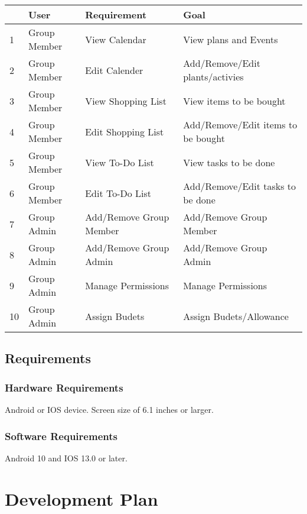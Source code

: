 \documentclass[12pt]{article}
\begin{document}
\begin{table}[h]
    \small
    \begin{tabularx}{\textwidth}{|p{12pt}|p{85pt}|X|X|}
        \hline  & User & Requirement & Goal \\
        \hline 1 & Group Member & View Calendar & View plans and Events \\
        \hline 2 & Group Member & Edit Calender & Add/Remove/Edit plants/activies \\
        \hline 3 & Group Member & View Shopping List & View items to be bought \\
        \hline 4 & Group Member & Edit Shopping List & Add/Remove/Edit items to be bought \\
        \hline 5 & Group Member & View To-Do List & View tasks to be done \\
        \hline 6 & Group Member & Edit To-Do List & Add/Remove/Edit tasks to be done \\
        \hline 7 & Group Admin & Add/Remove Group Member & Add/Remove Group Member \\
        \hline 8 & Group Admin & Add/Remove Group Admin & Add/Remove Group Admin \\
        \hline 9 & Group Admin & Manage Permissions & Manage Permissions \\
        \hline 10 & Group Admin & Assign Budets & Assign Budets/Allowance \\
        \hline 
    \end{tabularx}
\end{table}

\subsection{Requirements}

\subsubsection{Hardware Requirements}

Android or IOS device. Screen size of 6.1 inches or larger.

\subsubsection{Software Requirements}

Android 10 and IOS 13.0 or later.

\section{Development Plan}
\end{document}
